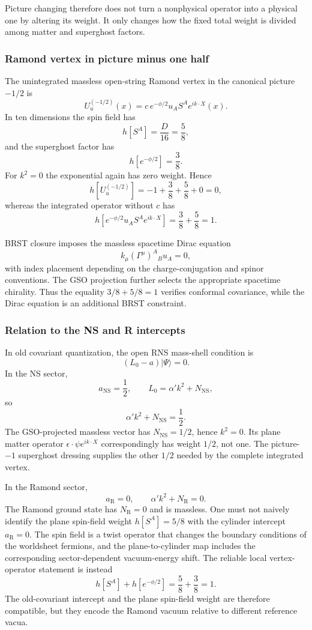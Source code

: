 \documentclass[
  10pt,
  a4paper,
  openany]{book}
\begin{document}
Picture changing therefore does not turn a nonphysical operator into a
physical one by altering its weight. It only changes how the fixed total
weight is divided among matter and superghost factors.

\subsubsection{Ramond vertex in picture minus one
half}\label{ramond-vertex-in-picture-minus-one-half}

The unintegrated massless open-string Ramond vertex in the canonical
picture \(-1/2\) is \[
U_u^{(-1/2)}(x)
=c\,e^{-\phi/2}u_AS^A e^{ik\cdot X}(x).
\] In ten dimensions the spin field has \[
h[S^A]=\frac{D}{16}=\frac58,
\] and the superghost factor has \[
h[e^{-\phi/2}]=\frac38.
\] For \(k^2=0\) the exponential again has zero weight. Hence \[
h[U_u^{(-1/2)}]
=-1+\frac38+\frac58+0=0,
\] whereas the integrated operator without \(c\) has \[
h[e^{-\phi/2}u_AS^Ae^{ik\cdot X}]
=\frac38+\frac58=1.
\]

BRST closure imposes the massless spacetime Dirac equation \[
k_\mu(\Gamma^\mu)^A{}_B u_A=0,
\] with index placement depending on the charge-conjugation and spinor
conventions. The GSO projection further selects the appropriate
spacetime chirality. Thus the equality \(3/8+5/8=1\) verifies conformal
covariance, while the Dirac equation is an additional BRST constraint.

\subsubsection{Relation to the NS and R
intercepts}\label{relation-to-the-ns-and-r-intercepts}

In old covariant quantization, the open RNS mass-shell condition is \[
(L_0-a)|\Psi\rangle=0.
\] In the NS sector, \[
a_{\mathrm{NS}}=\frac12,
\qquad
L_0=\alpha'k^2+N_{\mathrm{NS}},
\] so \[
\alpha'k^2+N_{\mathrm{NS}}=\frac12.
\] The GSO-projected massless vector has \(N_{\mathrm{NS}}=1/2\), hence
\(k^2=0\). Its plane matter operator \(\epsilon\cdot\psi e^{ik\cdot X}\)
correspondingly has weight \(1/2\), not one. The picture-\(-1\)
superghost dressing supplies the other \(1/2\) needed by the complete
integrated vertex.

In the Ramond sector, \[
a_{\mathrm R}=0,
\qquad
\alpha'k^2+N_{\mathrm R}=0.
\] The Ramond ground state has \(N_{\mathrm R}=0\) and is massless. One
must not naively identify the plane spin-field weight \(h[S^A]=5/8\)
with the cylinder intercept \(a_{\mathrm R}=0\). The spin field is a
twist operator that changes the boundary conditions of the worldsheet
fermions, and the plane-to-cylinder map includes the corresponding
sector-dependent vacuum-energy shift. The reliable local vertex-operator
statement is instead \[
h[S^A]+h[e^{-\phi/2}]
=\frac58+\frac38=1.
\] The old-covariant intercept and the plane spin-field weight are
therefore compatible, but they encode the Ramond vacuum relative to
different reference vacua.
\end{document}
